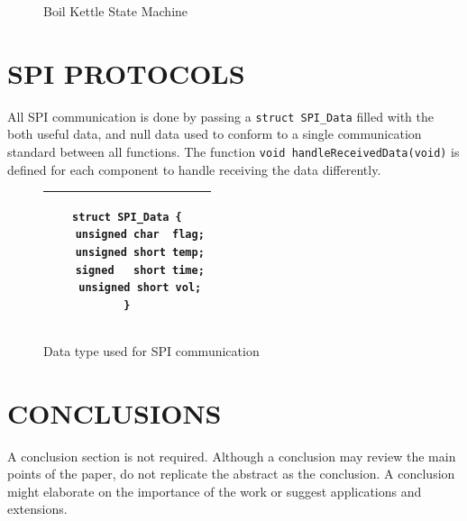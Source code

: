 \documentclass[letterpaper, 10 pt, conference]{ieeeconf}  %
\begin{document}
\begin{figure}[!htb]
  \centering
  
  \caption{Boil Kettle State Machine}
\end{figure}

\section{SPI PROTOCOLS}

All SPI communication is done by passing a \texttt{struct SPI\_Data} filled with the both useful data, and null data used to conform to a single communication standard between all functions. The function \texttt{void handleReceivedData(void)} is defined for each component to handle receiving the data differently.

\begin{figure}[thpb]
\begin{center}
\begin{tabular}{|c|}
\hline
\begin{lstlisting}
struct SPI_Data {
    unsigned char  flag;
    unsigned short temp;
    signed   short time;
    unsigned short vol;
}
\end{lstlisting} \\
\hline
\end{tabular}
\end{center}
\caption{Data type used for SPI communication}
\end{figure}

\section{CONCLUSIONS}

A conclusion section is not required. Although a conclusion may review the main points of the paper, do not replicate the abstract as the conclusion. A conclusion might elaborate on the importance of the work or suggest applications and extensions. 

\addtolength{\textheight}{-12cm}   %
\end{document}
